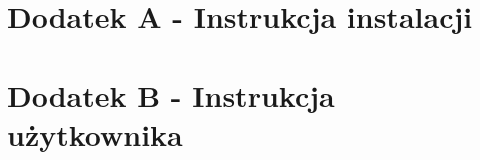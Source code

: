 \chapter*{Dodatek A - Instrukcja instalacji}
\label{sec:instrukcja-instalacji}



\newpage
\thispagestyle{empty}
\chapter*{Dodatek B - Instrukcja użytkownika}
\label{sec:instrukcja-uzytkownika}

